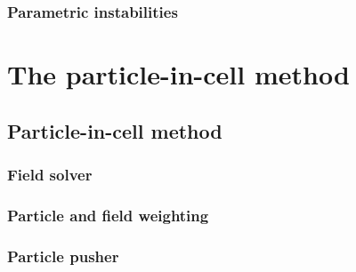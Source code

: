 \documentclass[12pt, twoside, a4paper, openright]{report}
\begin{document}
\subsection{Parametric instabilities}


%

%

%

%


\chapter{The particle-in-cell method}


\section{Particle-in-cell method}


\subsection{Field solver}


\subsection{Particle and field weighting}


\subsection{Particle pusher}

\end{document}
